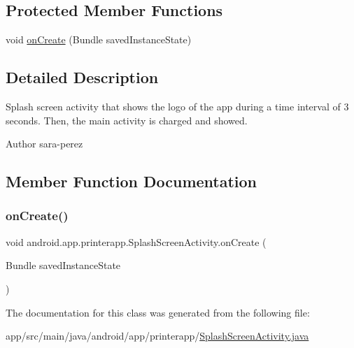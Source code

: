 \subsection*{Protected Member Functions}
\begin{DoxyCompactItemize}
\item 
void \hyperlink{classandroid_1_1app_1_1printerapp_1_1_splash_screen_activity_a2324ab67d9e5d4573b15ac5b8055d4b4}{on\+Create} (Bundle saved\+Instance\+State)
\end{DoxyCompactItemize}


\subsection{Detailed Description}
Splash screen activity that shows the logo of the app during a time interval of 3 seconds. Then, the main activity is charged and showed.

\begin{DoxyAuthor}{Author}
sara-\/perez 
\end{DoxyAuthor}


\subsection{Member Function Documentation}
\mbox{\label{classandroid_1_1app_1_1printerapp_1_1_splash_screen_activity_a2324ab67d9e5d4573b15ac5b8055d4b4}} 
\subsubsection{\texorpdfstring{on\+Create()}{onCreate()}}
{\footnotesize\ttfamily void android.\+app.\+printerapp.\+Splash\+Screen\+Activity.\+on\+Create (\begin{DoxyParamCaption}\item[{Bundle}]{saved\+Instance\+State }\end{DoxyParamCaption})\hspace{0.3cm}{\ttfamily [protected]}}



The documentation for this class was generated from the following file\+:\begin{DoxyCompactItemize}
\item 
app/src/main/java/android/app/printerapp/\hyperlink{_splash_screen_activity_8java}{Splash\+Screen\+Activity.\+java}\end{DoxyCompactItemize}
